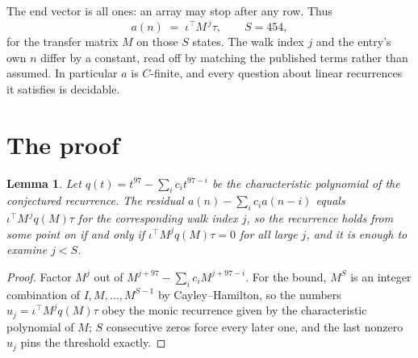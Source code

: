 \documentclass[11pt,a4paper]{article}
\theoremstyle{plain}
\newtheorem{lemma}[theorem]{Lemma}
\theoremstyle{definition}
\begin{document}
The end vector is all ones: an array may stop after any row. Thus
\[
a(n)\;=\;\iota^{\!\top}M^{\,j}\tau ,\qquad S=454,
\]
for the transfer matrix $M$ on those $S$ states. The walk index $j$ and the entry's own $n$
differ by a constant, read off by matching the published terms rather than assumed. In
particular $a$ is $C$-finite, and every question about linear recurrences it satisfies is
decidable.

\section{The proof}

\begin{lemma}\label{lem:crit}
Let $q(t)=t^{97}-\sum_i c_it^{97-i}$ be the characteristic polynomial of the
conjectured recurrence. The residual $a(n)-\sum_ic_ia(n-i)$ equals
$\iota^{\!\top}M^{\,j}q(M)\tau$ for the corresponding walk index $j$, so the recurrence
holds from some point on if and only if $\iota^{\!\top}M^{j}q(M)\tau=0$ for all large $j$,
and it is enough to examine $j<S$.
\end{lemma}

\begin{proof}
Factor $M^{j}$ out of $M^{j+97}-\sum_ic_iM^{j+97-i}$. For the bound, $M^{S}$
is an integer combination of $I,M,\dots,M^{S-1}$ by Cayley--Hamilton, so the numbers
$u_j=\iota^{\!\top}M^{j}q(M)\tau$ obey the monic recurrence given by the characteristic
polynomial of $M$; $S$ consecutive zeros force every later one, and the last nonzero $u_j$
pins the threshold exactly.
\end{proof}
\end{document}
